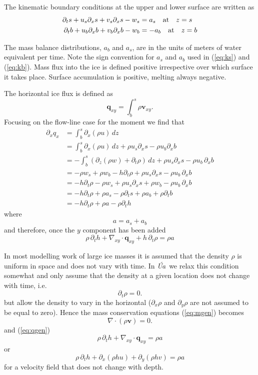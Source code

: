 \documentclass[10pt,a4paper]{book}
\newcommand{\p}{\partial}
\newcommand{\Ua}{\textsl{\'Ua}\,}
\begin{document}
The kinematic boundary conditions at the upper and lower surface are written as
\begin{align}
\p_t s + u_s \p_x s + v_s \p_x s - w_s &= a_s \quad \hbox{at} \quad z=s \label{eq:ks} \\
\p_t b + u_b \p_x b + v_b \p_x b - w_b &= -a_b \quad \hbox{at} \quad z=b \label{eq:kb}
\end{align}


The mass balance distributions, $a_b$ and $a_s$, are in the units of
meters of water equivalent per time. Note the sign convention for
$a_s$ and $a_b$ used in (\ref{eq:ks}) and (\ref{eq:kb}). Mass flux into
the ice is defined positive irrespective over which surface it takes
place. Surface accumulation is positive, melting always negative.

The horizontal ice flux is defined as 
\[
\bm{q}_{xy}=\int_b^s \rho \bm{v}_{xy} .
\]
Focusing on the flow-line case for the moment we find that
\begin{align*}
\p_x q_x &= \int_b^s \p_x (\rho u) \, dz \\
        &= \int_b^s \p_x (\rho u) \, dz + \rho u_s \p_x s - \rho u_b \p_x b  \\
        &= -\int_b^s ( \p_z (\rho w)  +\p_t \rho ) \, dz+ \rho u_s \p_x s - \rho u_b \, \p_x b  \\
        &= -\rho w_s + \rho w_b  - h \p_t \rho + \rho u_s \p_x s - \rho u_b \,\p_x b  \\
        &= -h \p_t \rho - \rho w_s + \rho u_s \p_x s + \rho w_b - \rho u_b \,\p_x b  \\
        &= -h \p_t \rho + \rho a_s - \rho \p_t s + \rho a_b + \rho \p_t b \\
        &= -h \p_t \rho + \rho a - \rho \p_t h
\end{align*}
where
\[ a=a_s+a_b \]
and therefore, once the $y$ component has been added
\begin{equation}
\rho \, \p_t h + \nabla_{xy} \cdot \bm{q}_{xy} + h \, \p_t \rho = \rho a
\label{eq:qgen}
\end{equation}


In most modelling work of large ice masses it is assumed that the
density $\rho$ is uniform in space and does not vary with time.  In \Ua
we relax this condition somewhat and only assume that the density at a
given location does not change with time, i.e.\
\[
\p_t \rho =0 .
\]
but allow the density to vary in the horizontal ($\p_x \rho $ and
$\p_y \rho$ are not assumed to be equal to zero). Hence the mass
conservation equations (\ref{eq:mgen}) becomes
\[
 \nabla \cdot (\rho \bm{v})=0.
\]
and (\ref{eq:qgen})
\begin{equation}
\rho \, \p_t h + \nabla_{xy} \cdot \bm{q}_{xy}  = \rho 
a\label{eq:qUa}
\end{equation}
or
\begin{equation}
\rho \, \p_t h + \p_x (\rho h u) + \p_y (\rho h v)  = \rho a
\label{eq:mass}
\end{equation}
for a velocity field that does not change with depth.
\end{document}
